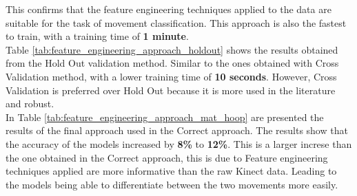             This confirms that the feature engineering techniques applied to the data are suitable for the task of movement classification. This approach is  also the fastest to train, with a training time of \textbf{1 minute}. \\

            Table \ref{tab:feature_engineering_approach_holdout} shows the results obtained from the Hold Out validation method. Similar to the ones obtained with Cross Validation method, with a lower training time of \textbf{10 seconds}. However, Cross Validation is preferred over Hold Out because it is more used in the literature and robust.\\

            In Table \ref{tab:feature_engineering_approach_mat_hoop} are presented the results of the final approach used in the Correct approach. The results show that the accuracy of the models increased by \textbf{8\%} to \textbf{12\%}. This is a larger increse than the one obtained in the Correct approach, this is due to Feature engineering techniques applied are more informative than the raw Kinect data. Leading to the models being able to differentiate between the two movements more easily. \\


